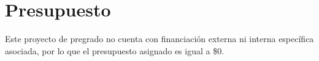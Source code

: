 \section{Presupuesto}
\label{sec:presupuesto}

Este proyecto de pregrado no cuenta con financiación externa ni interna específica asociada, por lo que el presupuesto asignado es igual a \$0.